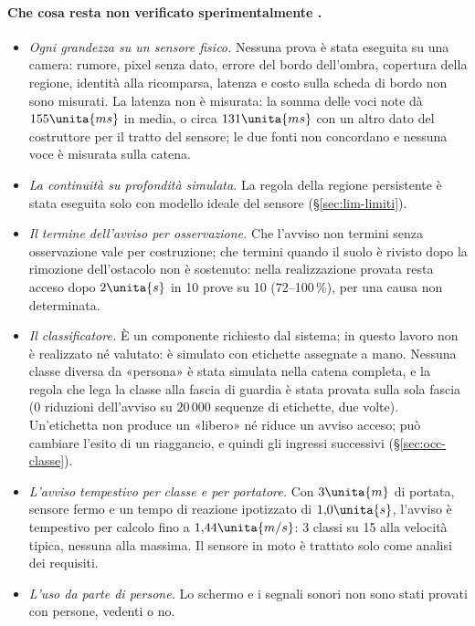 \paragraph{Che cosa resta non verificato sperimentalmente .}
\begin{itemize}
\item \emph{Ogni grandezza su un sensore fisico.} Nessuna prova è stata eseguita su una camera: rumore, pixel senza dato, errore del bordo dell'ombra, copertura della regione, identità alla ricomparsa, latenza e costo sulla scheda di bordo non sono misurati. La latenza non è misurata: la somma delle voci note dà $155\unita{ms}$ in media, o circa $131\unita{ms}$ con un altro dato del costruttore per il tratto del sensore; le due fonti non concordano e nessuna voce è misurata sulla catena.
\item \emph{La continuità su profondità simulata.} La regola della regione persistente è stata eseguita solo con modello ideale del sensore (\S\ref{sec:lim-limiti}).
\item \emph{Il termine dell'avviso per osservazione.} Che l'avviso non termini senza osservazione vale per costruzione; che termini quando il suolo è rivisto dopo la rimozione dell'ostacolo non è sostenuto: nella realizzazione provata resta acceso dopo $2\unita{s}$ in 10 prove su 10 (72--100\,\%), per una causa non determinata.
\item \emph{Il classificatore.} È un componente richiesto dal sistema; in questo lavoro non è realizzato né valutato: è simulato con etichette assegnate a mano. Nessuna classe diversa da «persona» è stata simulata nella catena completa, e la regola che lega la classe alla fascia di guardia è stata provata sulla sola fascia (0 riduzioni dell'avviso su $20\,000$ sequenze di etichette, due volte). Un'etichetta non produce un «libero» né riduce un avviso acceso; può cambiare l'esito di un riaggancio, e quindi gli ingressi successivi (\S\ref{sec:occ-classe}).
\item \emph{L'avviso tempestivo per classe e per portatore.} Con $3\unita{m}$ di portata, sensore fermo e un tempo di reazione ipotizzato di $1{,}0\unita{s}$, l'avviso è tempestivo per calcolo fino a $1{,}44\unita{m/s}$: 3 classi su 15 alla velocità tipica, nessuna alla massima. Il sensore in moto è trattato solo come analisi dei requisiti.
\item \emph{L'uso da parte di persone.} Lo schermo e i segnali sonori non sono stati provati con persone, vedenti o no.
\end{itemize}

